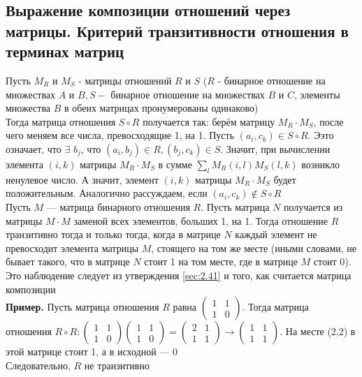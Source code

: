 \documentclass[a4paper]{article}
\begin{document}
\subsection{Выражение композиции отношений через матрицы. Критерий транзитивности отношения в терминах матриц}
Пусть $M_{R}$ и $M_{S}$ - матрицы отношений $R$ и $S$ ($R$ - бинарное отношение на множествах $A$ и $B, S-$ бинарное отношение на множествах $B$ и $C$, элементы множества $B$ в обеих матрицах пронумерованы одинаково)\\[2mm]
\indent Тогда матрица отношения $S \circ R$ получается так: берём матрицу $M_{R} \cdot M_{S}$, после чего меняем все числа, превосходящие 1, на 1. Пусть $\left(a_{i}, c_{k}\right) \in S \circ R$. Ээто означает, что $\exists$ $b_{j}$, что $\left(a_{i}, b_{j}\right) \in R,\left(b_{j}, c_{k}\right) \in S$. Значит, при вычислении элемента $(i, k)$ матрицы $M_{R} \cdot M_{S}$ в сумме $\sum_{l} M_{R}(i, l) M_{S}(l, k)$ возникло ненулевое число. А значит, элемент $(i, k)$ матрицы $M_{R} \cdot M_{S}$ будет положительным. Аналогично рассуждаем, если $\left(a_{i}, c_{k}\right) \notin S \circ R$\\[2mm]
\indent Пусть $M$ — матрица бинарного отношения $R$. Пусть матрица $N$ получается из матрицы $M\cdot M$ заменой всех элементов, больших 1, на 1. Тогда отношение $R$ транзитивно тогда и только тогда, когда в матрице $N$ каждый элемент не превосходит элемента матрицы $M$, стоящего на том же месте (иными словами, не бывает такого, что в матрице $N$ стоит 1 на том месте, где в матрице $M$ стоит 0). Это наблюдение следует из утверждения \ref{sec:2.41} и того, как считается матрица композиции\\[2mm]
\textbf{Пример.} Пусть матрица отношения $R$ равна $\begin{pmatrix}
    1&1\\
    1&0
\end{pmatrix}$. Тогда матрица отношения $R\circ R:\begin{pmatrix}
    1&1\\
    1&0
\end{pmatrix}\begin{pmatrix}
    1&1\\
    1&0
\end{pmatrix}=\begin{pmatrix}
    2&1\\
    1&1
\end{pmatrix}\rightarrow\begin{pmatrix}
    1&1\\
    1&1
\end{pmatrix}$. На месте (2,2) в этой матрице стоит 1, а в исходной — 0\\[2mm]
Следовательно, $R$ не транзитивно
\end{document}
